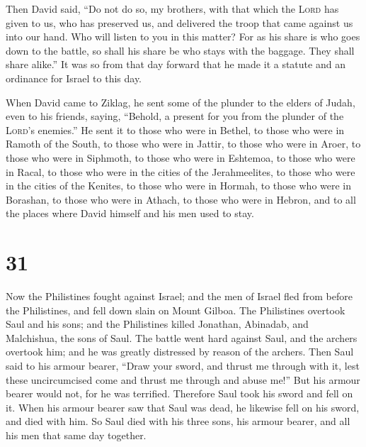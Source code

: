  Then David said, ``Do not do so, my brothers, with that
which the \textsc{Lord} has given to us, who has preserved us, and
delivered the troop that came against us into our hand. 
Who will listen to you in this matter? For as his share is who goes down
to the battle, so shall his share be who stays with the baggage. They
shall share alike.''  It was so from that day forward
that he made it a statute and an ordinance for Israel to this day.

 When David came to Ziklag, he sent some of the plunder
to the elders of Judah, even to his friends, saying, ``Behold, a present
for you from the plunder of the \textsc{Lord}'s enemies.''
 He sent it to those who were in Bethel, to those who
were in Ramoth of the South, to those who were in Jattir,
 to those who were in Aroer, to those who were in
Siphmoth, to those who were in Eshtemoa,  to those who
were in Racal, to those who were in the cities of the Jerahmeelites, to
those who were in the cities of the Kenites,  to those
who were in Hormah, to those who were in Borashan, to those who were in
Athach,  to those who were in Hebron, and to all the
places where David himself and his men used to stay.

\hypertarget{section-30}{%
\section{31}\label{section-30}}

 Now the Philistines fought against Israel; and the men of
Israel fled from before the Philistines, and fell down slain on Mount
Gilboa.  The Philistines overtook Saul and his sons; and
the Philistines killed Jonathan, Abinadab, and Malchishua, the sons of
Saul.  The battle went hard against Saul, and the archers
overtook him; and he was greatly distressed by reason of the archers.
 Then Saul said to his armour bearer, ``Draw your sword,
and thrust me through with it, lest these uncircumcised come and thrust
me through and abuse me!'' But his armour bearer would not, for he was
terrified. Therefore Saul took his sword and fell on it. 
When his armour bearer saw that Saul was dead, he likewise fell on his
sword, and died with him.  So Saul died with his three
sons, his armour bearer, and all his men that same day together.


